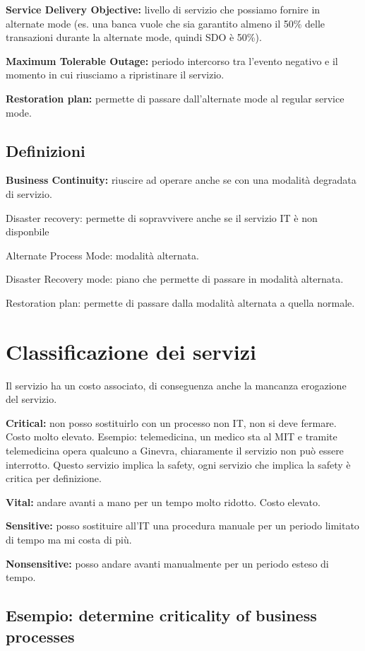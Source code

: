 \textbf{Service Delivery Objective:} livello di servizio che possiamo fornire in alternate mode (es. una banca vuole che sia garantito almeno il 50\% delle transazioni durante la alternate mode, quindi SDO è 50\%).

\textbf{Maximum Tolerable Outage:} periodo intercorso tra l'evento negativo e il momento in cui riusciamo a ripristinare il servizio.

\textbf{Restoration plan:} permette di passare dall'alternate mode al regular service mode.

\subsection{Definizioni}

\textbf{Business Continuity:} riuscire ad operare anche se con una modalità degradata di servizio.

Disaster recovery: permette di sopravvivere anche se il servizio IT è non disponbile

Alternate Process Mode: modalità alternata.

Disaster Recovery mode: piano che permette di passare in modalità alternata.

Restoration plan: permette di passare dalla modalità alternata a quella normale.

\section{Classificazione dei servizi}

Il servizio ha un costo associato, di conseguenza anche la mancanza erogazione del servizio.

\textbf{Critical:} non posso sostituirlo con un processo non IT, non si deve fermare. Costo molto elevato. Esempio: telemedicina, un medico sta al MIT e tramite telemedicina opera qualcuno a Ginevra, chiaramente il servizio non può essere interrotto. Questo servizio implica la safety, ogni servizio che implica la safety è critica per definizione.

\textbf{Vital:} andare avanti a mano per un tempo molto ridotto. Costo elevato.

\textbf{Sensitive:} posso sostituire all'IT una procedura manuale per un periodo limitato di tempo ma mi costa di più.

\textbf{Nonsensitive:} posso andare avanti manualmente per un periodo esteso di tempo.

\subsection{Esempio: determine criticality of business processes}

